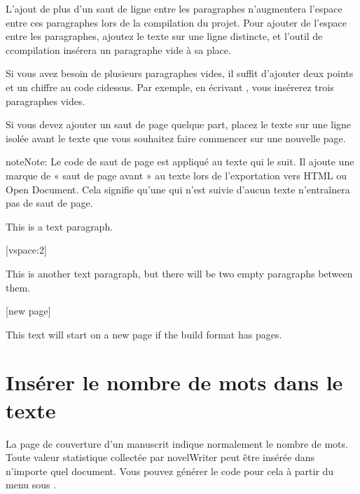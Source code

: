 \documentclass[a4paper,11pt,french]{sphinxmanual}
\begin{document}
\sphinxAtStartPar
L’ajout de plus d’un saut de ligne entre les paragraphes n’augmentera  l’espace entre ces paragraphes lors de la compilation du projet. Pour ajouter de l’espace entre les paragraphes, ajoutez le texte \sphinxcode{\sphinxupquote{{[}vspace{]}}} sur une ligne distincte, et l’outil de ccompilation insérera un paragraphe vide à sa place.

\sphinxAtStartPar
Si vous avez besoin de plusieurs paragraphes vides, il suffit d’ajouter deux points et un chiffre au code ci\sphinxhyphen{}dessus. Par exemple, en écrivant \sphinxcode{\sphinxupquote{{[}vspace:3{]}}}, vous insérerez trois paragraphes vides.

\sphinxAtStartPar
Si vous devez ajouter un saut de page quelque part, placez le texte  sur une ligne isolée avant le texte que vous souhaitez faire commencer sur une nouvelle page.

\begin{sphinxadmonition}{note}{Note:}
\sphinxAtStartPar
Le code de saut de page est appliqué au texte qui le suit. Il ajoute une marque de « saut de page avant » au texte lors de l’exportation vers HTML ou Open Document. Cela signifie qu’une  qui n’est suivie d’aucun texte n’entraînera pas de saut de page.
\end{sphinxadmonition}

\sphinxAtStartPar
{}

\begin{sphinxVerbatim}[commandchars=\\\{\}]
This is a text paragraph.

[vspace:2]

This is another text paragraph, but there will be two empty paragraphs
between them.

[new page]

This text will start on a new page if the build format has pages.
\end{sphinxVerbatim}


\section{Insérer le nombre de mots dans le texte}
\label{\detokenize{usage_format:inserting-word-counts-in-the-text}}\label{\detokenize{usage_format:a-fmt-stats}}
\sphinxAtStartPar
La page de couverture d’un manuscrit indique normalement le nombre de mots. Toute valeur statistique collectée par novelWriter peut être insérée dans n’importe quel document. Vous pouvez générer le code pour cela à partir du menu  sous .
\end{document}
